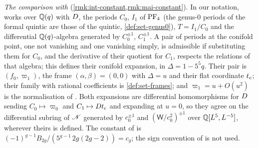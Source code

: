 \emph{The comparison with \cite{CGYZ26}} (\cref{rmk:int-constant,rmk:mai-constant}). In our notation, \cite[Def.~1.1]{CGYZ26} works over $\mathbb{Q}(q)$ with $D$, the periods $C_0$, $I_1$ of $\mathrm{PF}_{4}$ (the genus-$0$ periods of the formal quintic are those of the quintic, \cref{def:set-genus0}), $T=I_1/C_0$ and the differential $\mathbb{Q}(q)$-algebra generated by $C_0^{\pm1}$, $C_1^{\pm1}$. A pair of periods at the conifold point, one not vanishing and one vanishing simply, is admissible \cite[Def.~1.2]{CGYZ26} if substituting them for $C_0$, and the derivative of their quotient for $C_1$, respects the relations of that algebra; this defines their conifold expansion, in $\Delta=1-5^5q$. Their pair \cite[Ex.~1.3]{CGYZ26} is $(f_0,\varpi_1)$, the frame $(\alpha,\beta)=(0,0)$ with $\Delta=u$ and their flat coordinate $t_{\mathrm{c}}$; their family \cite[Rem.~1.4]{CGYZ26} with rational coefficients is \cref{def:set-frames}; and $\varpi_1=u+O(u^2)$ is the normalisation of \cite[\S4.2, Prop.-Def.~4.5\,(1)]{CGYZ26}. Both expansions are differential homomorphisms for $D$ sending $C_0\mapsto\varpi_0$ and $C_1\mapsto Dt_{\mathrm{c}}$ and expanding at $u=0$, so they agree on the differential subring of $\mathscr{N}$ generated by $c_0^{\pm1}$ and $(\mathsf W/c_0^2)^{\pm1}$ over $\mathbb{Q}[L^5,L^{-5}]$, wherever theirs is defined. The constant of \cite[Conj.~1.5]{CGYZ26} is $(-1)^{g-1}B_{2g}/(5^{g-1}\,2g(2g-2))=c_g$; the sign convention of \cite[Def.~1.8]{CGYZ26} is not used.

